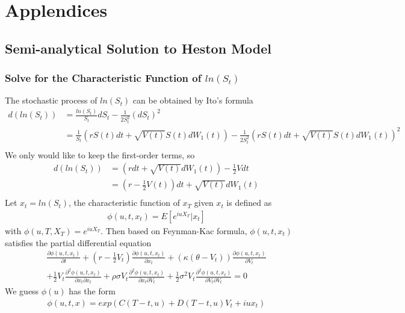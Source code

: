 \documentclass[a4paper]{article}
\begin{document}
\section{Applendices}
\subsection{Semi-analytical Solution to Heston Model}
\subsubsection{Solve for the Characteristic Function of $ln(S_t)$}
The stochastic process of $ln(S_t)$ can be obtained by Ito's formula
\begin{align*}
	d(ln(S_t)) & = \frac{ln(S_t)}{S_t} dS_t - \frac{1}{2S_t^2} (dS_t)^2 \\
		   & = \frac{1}{S_t} (rS(t)dt + \sqrt{V(t)}S(t)dW_1(t))
		      - \frac{1}{2S_t^2} (rS(t)dt + \sqrt{V(t)}S(t)dW_1(t))^2 \\
\end{align*}
We only would like to keep the first-order terms, so
\begin{align*}
	d(ln(S_t)) & = (r dt + \sqrt{V(t)}dW_1(t)) - \frac{1}{2}V dt \\
		  & = (r - \frac{1}{2}V(t)) dt + \sqrt{V(t)} dW_1(t) \\
\end{align*}
Let $x_t = ln(S_t)$, the characteristic function of $x_T$ given $x_t$ is defined as
\begin{align*}
	\phi(u, t, x_t) = E[e^{iuX_T}|x_t]
\end{align*}
with $\phi(u, T, X_T) = e^{iuX_T}$. Then based on Feynman-Kac formula, $\phi(u, t, x_t)$ satisfies the partial
differential equation
\begin{align}
	\frac{\partial \phi(u, t, x_t)}{\partial t} + (r - \frac{1}{2}V_t)\frac{\partial \phi(u, t, x_t)}{\partial x_t} 
	+ (\kappa(\theta-V_t)) \frac{\partial \phi(u, t, x_t)}{ \partial V_t}   \nonumber \\ 
	+ \frac{1}{2}  V_t \frac{\partial^2 \phi(u, t, x_t)}{ \partial x_t \partial x_t } 
	+ \rho \sigma V_t \frac{\partial^2 \phi(u, t, x_t)}{ \partial x_t \partial V_t}
	+\frac{1}{2} \sigma^2 V_t \frac{\partial^2 \phi(u, t, x_t)}{ \partial V_t \partial V_t}  = 0 \label{characteristic_pde1}
\end{align}
We guess $\phi(u)$ has the form 
\begin{align}
	\phi(u,t, x) = exp(C(T-t, u) + D(T-t, u)V_t + iux_t) \label{phi}
\end{align}
\end{document}
